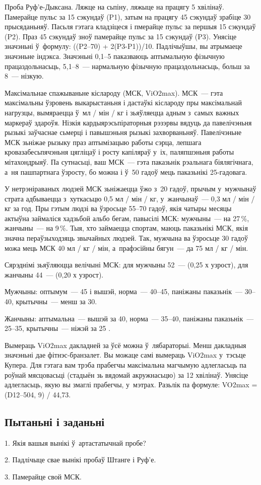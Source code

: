Проба Руф'е-Дыксана. Ляжце на сьпіну, ляжыце на працягу 5 хвілінаў. Памерайце пульс за 15 сэкундаў (P1), затым на працягу 45 сэкундаў зрабіце 30 прысяданьняў. Пасьля гэтага кладзіцеся і пмерайце пульс за першыя 15 сэкундаў (P2). Праз 45 сэкундаў зноў памерайце пульс за 15 сэкундаў (P3). Унясіце значэньні ў~формулу: ((P2--70) + 2(P3-P1))/10. Падлічыўшы, вы атрымаеце значэньне індэкса. Значэньні 0,1--5 паказваюць аптымальную фізычную працаздольнасьць, 5,1--8~--- нармальную фізычную працаздольнасьць, больш за 8~--- нізкую.

Максімальнае спажываньне кіслароду (МСК, ViO2max). МСК~--- гэта максімальны ўзровень выкарыстаньня і дастаўкі кіслароду пры максімальнай нагрузцы, вымяраецца ў~мл / мін / кг і зьяўляецца адным з~самых важных маркераў здароўя. Нізкія кардыярэсьпіраторныя рэзэрвы вядуць да павелічэньня рызыкі заўчаснае сьмерці і павышэньня рызыкі захворваньняў. Павелічэньне МСК зьніжае рызыку праз аптымізацыю работы сэрца, лепшага кровазабесьпячэньня цягліцаў і росту капіляраў у~іх, паляпшэньня работы мітахондрыяў. Па сутнасьці, ваш МСК~--- гэта паказьнік рэальнага біялягічнага, а~ня пашпартнага ўзросту, бо можна і ў~50 гадоў мець паказьнікі 25-гадовага. 

У нетрэніраваных людзей МСК зьніжаецца ўжо з~20 гадоў, прычым у~мужчынаў страта адбываецца з~хуткасьцю 0,5 мл / мін / кг, у~жанчынаў~--- 0,3 мл / мін / кг за год. Пры гэтым людзі ва ўзросьце 55--70 гадоў, якія чатыры месяцы актыўна займаліся хадзьбой альбо бегам, павысілі МСК: мужчыны~--- на 27\,\%, жанчыны~--- на 9\,\%. Тыя, хто займаецца спортам, маюць паказьнікі МСК, якія значна пераўзыходзяць звычайных людзей. Так, мужчына ва ўзросьце 30 гадоў можа мець МСК 40 мл / кг / мін, а~прафэсійны бягун~--- да 75 мл / кг / мін.

Сярэднімі зьяўляюцца велічыні МСК: для мужчыны 52~--- (0,25 х узрост), для жанчыны 44~--- (0,20 х узрост). 

Мужчыны: оптымум~--- 45 і вышэй, норма~--- 40--45, паніжаны паказьнік~--- 30--40, крытычны~--- менш за 30. 

Жанчыны: аптымальна~--- вышэй за 40, норма~--- 35--40, паніжаны паказьнік~--- 25--35, крытычны~--- ніжэй за 25 .

Вымераць ViO2max дакладней за ўсё можна ў~лябараторыі. Менш дакладныя значэньні дае фітнэс-бранзалет. Вы можаце самі вымераць ViO2max у~тэсьце Купера. Для гэтага вам трэба прабегчы максімальна магчымую адлегласьць па роўнай мясцовасьці (стадыён зь вядомай акружнасьцю) за 12 хвілінаў. Унясіце адлегласьць, якую вы змаглі прабегчы, у~мэтрах. Разьлік па формуле: VO2max = (D12--504, 9) / 44,73.

\subsection*{Пытаньні і заданьні}

1. Якія вашыя вынікі ў~артастатычнай пробе?

2. Падлічыце свае вынікі пробаў Штанге і Руф'е.

3. Памерайце свой МСК.

